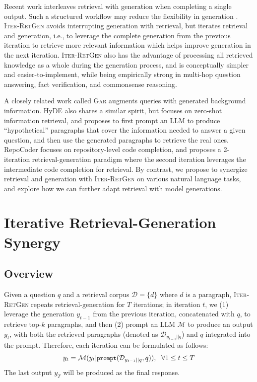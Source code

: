 \documentclass[11pt]{article}
\begin{document}
Recent work interleaves retrieval with generation when completing a single output.
Such a structured workflow may reduce the flexibility in generation \cite{DBLP:journals/corr/abs-2210-03629}.
I\textsc{ter}-R\textsc{et}G\textsc{en} avoids interrupting generation with retrieval, but iterates retrieval and generation, i.e., to leverage the complete generation from the previous iteration to retrieve more relevant information which helps improve generation in the next iteration.
I\textsc{ter}-R\textsc{et}G\textsc{en} also has the advantage of processing all retrieved knowledge as a whole during the generation process, and is conceptually simpler and easier-to-implement, while being empirically strong in multi-hop question answering, fact verification, and commonsense reasoning.

A closely related work called G\textsc{ar} \cite{DBLP:conf/acl/MaoHLSG0C20} augments queries with generated background information.
HyDE \cite{DBLP:journals/corr/abs-2212-10496} also shares a similar spirit, but focuses on zero-shot information retrieval, and proposes to first prompt an LLM to produce ``hypothetical'' paragraphs that cover the information needed to answer a given question, and then use the generated paragraphs to retrieve the real ones.
RepoCoder \cite{DBLP:journals/corr/abs-2303-12570} focuses on repository-level code completion, and proposes a 2-iteration retrieval-generation paradigm where the second iteration leverages the intermediate code completion for retrieval.
By contrast, we propose to synergize retrieval and generation with I\textsc{ter}-R\textsc{et}G\textsc{en} on various natural language tasks, and explore how we can further adapt retrieval with model generations.

\section{Iterative Retrieval-Generation Synergy}

\subsection{Overview}

Given a question $q$ and a retrieval corpus $\mathcal{D} = \{d\}$ where $d$ is a paragraph, I\textsc{ter}-R\textsc{et}G\textsc{en} repeats retrieval-generation for $T$ iterations;
in iteration $t$, we
(1) leverage the generation $y_{t - 1}$ from the previous iteration, concatenated with $q$, to retrieve top-$k$ paragraphs,
and then (2) prompt an LLM $\mathcal{M}$ to produce an output $y_t$, with both the retrieved paragraphs (denoted as $\mathcal{D}_{y_{t - 1} || q}$) and $q$ integrated into the prompt.
Therefore, each iteration can be formulated as follows:
\begin{equation}
\small
    y_t = \mathcal{M}(y_t | \text{\texttt{prompt}}(\mathcal{D}_{y_{t - 1} || q}, q)),\ \ \forall 1 \le t \le T
\end{equation}
The last output $y_T$ will be produced as the final response.
\end{document}
